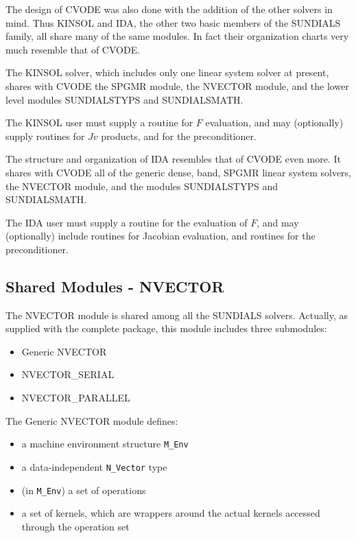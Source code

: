 The design of CVODE was also done with the addition of the other
solvers in mind.  Thus KINSOL and IDA, the other two basic members of
the SUNDIALS family, all share many of the same modules.  In fact
their organization charts very much resemble that of CVODE.

The KINSOL solver, which includes only one linear system solver at
present, shares with CVODE the SPGMR module, the NVECTOR module, and
the lower level modules SUNDIALSTYPS and SUNDIALSMATH.

The KINSOL user must supply a routine for $F$ evaluation, and may
(optionally) supply routines for $Jv$ products, and for the
preconditioner.

The structure and organization of IDA resembles that of CVODE even
more.  It shares with CVODE all of the generic dense, band, SPGMR
linear system solvers, the NVECTOR module, and the modules
SUNDIALSTYPS and SUNDIALSMATH.

The IDA user must supply a routine for the evaluation of $F$, and may
(optionally) include routines for Jacobian evaluation, and routines
for the preconditioner.

\subsection{Shared Modules - NVECTOR}

The NVECTOR module is shared among all the SUNDIALS solvers.
Actually, as supplied with the complete package, this module
includes three submodules:
\vspace*{-.19in}
\begin{itemize}
\item Generic NVECTOR
\item NVECTOR\_SERIAL
\item NVECTOR\_PARALLEL
\end{itemize}

The Generic NVECTOR module defines:
\vspace*{-.19in}
\begin{itemize}
\item a machine environment structure {\tt M\_Env}
\item a data-independent {\tt N\_Vector} type
\item (in {\tt M\_Env}) a set of operations
\item a set of kernels, which are wrappers around the actual kernels
accessed through the operation set
\end{itemize}

